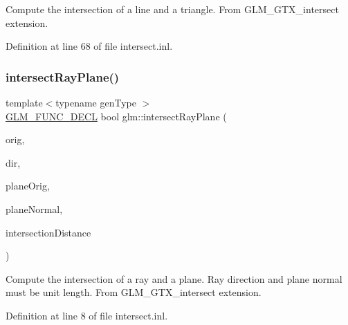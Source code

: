 Compute the intersection of a line and a triangle. From G\+L\+M\+\_\+\+G\+T\+X\+\_\+intersect extension. 

Definition at line 68 of file intersect.\+inl.

\mbox{\label{group__gtx__intersect_gad3697a9700ea379739a667ea02573488}} 
\subsubsection{\texorpdfstring{intersectRayPlane()}{intersectRayPlane()}}
{\footnotesize\ttfamily template$<$typename gen\+Type $>$ \\
\mbox{\hyperlink{setup_8hpp_ab2d052de21a70539923e9bcbf6e83a51}{G\+L\+M\+\_\+\+F\+U\+N\+C\+\_\+\+D\+E\+CL}} bool glm\+::intersect\+Ray\+Plane (\begin{DoxyParamCaption}\item[{gen\+Type const \&}]{orig,  }\item[{gen\+Type const \&}]{dir,  }\item[{gen\+Type const \&}]{plane\+Orig,  }\item[{gen\+Type const \&}]{plane\+Normal,  }\item[{typename gen\+Type\+::value\+\_\+type \&}]{intersection\+Distance }\end{DoxyParamCaption})}

Compute the intersection of a ray and a plane. Ray direction and plane normal must be unit length. From G\+L\+M\+\_\+\+G\+T\+X\+\_\+intersect extension. 

Definition at line 8 of file intersect.\+inl.

\mbox{\label{group__gtx__intersect_gac88f8cd84c4bcb5b947d56acbbcfa56e}} 
